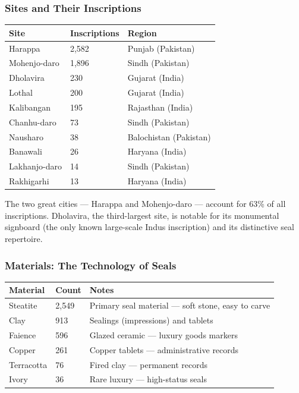 \documentclass[
  11pt,
]{article}
\newcounter{none} %
\begin{document}
\subsubsection{Sites and Their
Inscriptions}\label{sites-and-their-inscriptions}

{\def\LTcaptype{none} %
\begin{longtable}[]{@{}lll@{}}
\toprule\noalign{}
Site & Inscriptions & Region \\
\midrule\noalign{}
\endhead
\bottomrule\noalign{}
\endlastfoot
Harappa & 2,582 & Punjab (Pakistan) \\
Mohenjo-daro & 1,896 & Sindh (Pakistan) \\
Dholavira & 230 & Gujarat (India) \\
Lothal & 200 & Gujarat (India) \\
Kalibangan & 195 & Rajasthan (India) \\
Chanhu-daro & 73 & Sindh (Pakistan) \\
Nausharo & 38 & Balochistan (Pakistan) \\
Banawali & 26 & Haryana (India) \\
Lakhanjo-daro & 14 & Sindh (Pakistan) \\
Rakhigarhi & 13 & Haryana (India) \\
\end{longtable}
}

The two great cities --- Harappa and Mohenjo-daro --- account for 63\%
of all inscriptions. Dholavira, the third-largest site, is notable for
its monumental signboard (the only known large-scale Indus inscription)
and its distinctive seal repertoire.

\subsubsection{Materials: The Technology of
Seals}\label{materials-the-technology-of-seals}

{\def\LTcaptype{none} %
\begin{longtable}[]{@{}lll@{}}
\toprule\noalign{}
Material & Count & Notes \\
\midrule\noalign{}
\endhead
\bottomrule\noalign{}
\endlastfoot
Steatite & 2,549 & Primary seal material --- soft stone, easy to
carve \\
Clay & 913 & Sealings (impressions) and tablets \\
Faience & 596 & Glazed ceramic --- luxury goods markers \\
Copper & 261 & Copper tablets --- administrative records \\
Terracotta & 76 & Fired clay --- permanent records \\
Ivory & 36 & Rare luxury --- high-status seals \\
\end{longtable}
}
\end{document}
